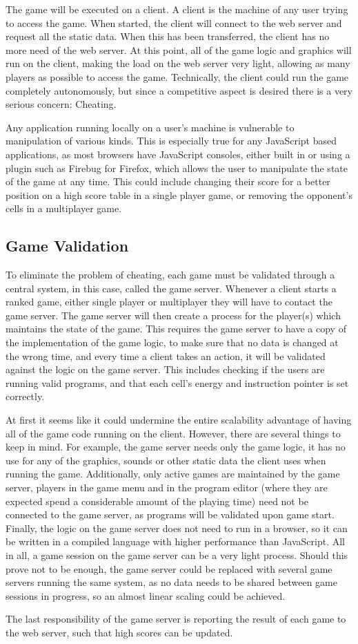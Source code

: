 The game will be executed on a client. A client is the machine of any user trying to access the game. When started, the client will connect to the web server and request all the static data. When this has been transferred, the client has no more need of the web server. At this point, all of the game logic and graphics will run on the client, making the load on the web server very light, allowing as many players as possible to access the game. Technically, the client could run the game completely autonomously, but since a competitive aspect is desired there is a very serious concern: Cheating.

Any application running locally on a user's machine is vulnerable to manipulation of various kinds. This is especially true for any JavaScript based applications, as most browsers have JavaScript consoles, either built in or using a plugin such as Firebug for Firefox, which allows the user to manipulate the state of the game at any time. This could include changing their score for a better position on a high score table in a single player game, or removing the opponent's cells in a multiplayer game.

\subsection{Game Validation}

To eliminate the problem of cheating, each game must be validated through a central system, in this case, called the game server. Whenever a client starts a ranked game, either single player or multiplayer they will have to contact the game server. The game server will then create a process for the player(s) which maintains the state of the game. This requires the game server to have a copy of the implementation of the game logic, to make sure that no data is changed at the wrong time, and every time a client takes an action, it will be validated against the logic on the game server. This includes checking if the users are running valid programs, and that each cell's energy and instruction pointer is set correctly.

At first it seems like it could undermine the entire scalability advantage of having all of the game code running on the client. However, there are several things to keep in mind. For example, the game server needs only the game logic, it has no use for any of the graphics, sounds or other static data the client uses when running the game. Additionally, only active games are maintained by the game server, players in the game menu and in the program editor (where they are expected spend a considerable amount of the playing time) need not be connected to the game server, as programs will be validated upon game start. Finally, the logic on the game server does not need to run in a browser, so it can be written in a compiled language with higher performance than JavaScript. All in all, a game session on the game server can be a very light process. Should this prove not to be enough, the game server could be replaced with several game servers running the same system, as no data needs to be shared between game sessions in progress, so an almost linear scaling could be achieved.

The last responsibility of the game server is reporting the result of each game to the web server, such that high scores can be updated.

